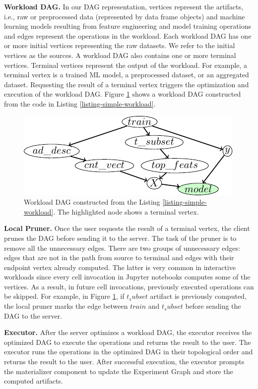 \textbf{Workload DAG.}
In our DAG representation, vertices represent the artifacts, i.e., raw or preprocessed data (represented by data frame objects) and machine learning models resulting from feature engineering and model training operations and edges represent the operations in the workload.
Each workload DAG has one or more initial vertices representing the raw datasets.
We refer to the initial vertices as the sources.
A workload DAG also contains one or more terminal vertices.
Terminal vertices represent the output of the workload.
For example, a terminal vertex is a trained ML model, a preprocessed dataset, or an aggregated dataset.
Requesting the result of a terminal vertex triggers the optimization and execution of the workload DAG.
Figure \ref{fig-workload-dag} shows a workload DAG constructed from the code in Listing \ref{listing-simple-workload}.
\begin{figure}
\centering
\includegraphics[width=\linewidth]{../images/tikz-standalone/example-graph}
\caption{Workload DAG constructed from the Listing \ref{listing-simple-workload}. The highlighted node shows a terminal vertex.}
\label{fig-workload-dag}
\end{figure}

\textbf{Local Pruner.}
Once the user requests the result of a terminal vertex, the client prunes the DAG before sending it to the server.
The task of the pruner is to remove all the unnecessary edges.
There are two groups of unnecessary edges: edges that are not in the path from source to terminal and edges with their endpoint vertex already computed.
The latter is very common in interactive workloads since every cell invocation in Jupyter notebooks computes some of the vertices.
As a result, in future cell invocations, previously executed operations can be skipped.
For example, in Figure \ref{fig-workload-dag}, if $t_subset$ artifact is previously computed, the local pruner marks the edge between $train$ and $t_subset$ before sending the DAG to the server.

\textbf{Executor. }
After the server optimizes a workload DAG, the executor receives the optimized DAG to execute the operations and returns the result to the user.
The executor runs the operations in the optimized DAG in their topological order and returns the result to the user.
After successful execution, the executor prompts the materializer component to update the Experiment Graph and store the computed artifacts.


